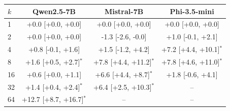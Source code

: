 \begin{tabular}{lccc}
\toprule
$k$ & Qwen2.5-7B & Mistral-7B & Phi-3.5-mini \\
\midrule
1 & +0.0 [+0.0, +0.0] & +0.0 [+0.0, +0.0] & +0.0 [+0.0, +0.0] \\
2 & +0.0 [+0.0, +0.0] & -1.3 [-2.6, -0.0] & +1.0 [-0.1, +2.1] \\
4 & +0.8 [-0.1, +1.6] & +1.5 [-1.2, +4.2] & +7.2 [+4.4, +10.1]$^{*}$ \\
8 & +1.6 [+0.5, +2.7]$^{*}$ & +7.8 [+4.4, +11.2]$^{*}$ & +7.8 [+4.6, +11.0]$^{*}$ \\
16 & +0.6 [+0.0, +1.1] & +6.6 [+4.4, +8.7]$^{*}$ & +1.8 [-0.6, +4.1] \\
32 & +1.4 [+0.4, +2.4]$^{*}$ & +6.4 [+2.5, +10.3]$^{*}$ & -- \\
64 & +12.7 [+8.7, +16.7]$^{*}$ & -- & -- \\
\bottomrule
\end{tabular}
